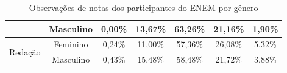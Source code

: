 \begin{table}[h]
\begin{tabular}{ccccccc}
                                                                                     & Masculino & 0,00\%                         & 13,67\%      & 63,26\%      & 21,16\%      & 1,90\%        \\ \hline
    \multirow{2}{*}{Redação}                                                         & Feminino  & 0,24\%                         & 11,00\%      & 57,36\%      & 26,08\%      & 5,32\%        \\ \cline{2-7} 
                                                                                     & Masculino & 0,43\%                         & 15,48\%      & 58,48\%      & 21,72\%      & 3,88\%        \\ \hline
    \end{tabular}
    \caption{Observações de notas dos participantes do ENEM por gênero}
    \label{tab:observacao-nota-enem}
    \end{table}

